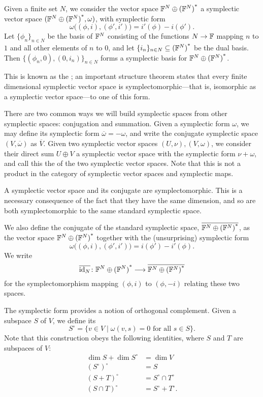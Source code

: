 \begin{example}
  \label{ex:symplectic_space_generated_by_set}
  Given a finite set $N$, we consider the vector space ${{\mathbb F}^{N} \oplus {({\mathbb F}^{N})}^\ast}$ a symplectic
  vector space $({{\mathbb F}^{N} \oplus {({\mathbb F}^{N})}^\ast},\omega)$, with symplectic form 
  \[
    \omega\big((\phi,i),(\phi',i')\big) = i'(\phi)-i(\phi').  
  \] 
  Let $\{\phi_n\}_{n \in N}$ be the basis of ${\mathbb F}^N$ consisting of the functions
  $N \to {\mathbb F}$ mapping $n$ to $1$ and all other elements of $n$ to $0$, and let
  $\{i_n\}_{n \in N} \subseteq {({\mathbb F}^N)}^\ast$ be the dual basis. Then
  $\{(\phi_n,0),(0,i_n)\}_{n\in N}$ forms a symplectic basis for ${{\mathbb F}^{N} \oplus {({\mathbb F}^{N})}^\ast}$.  

  This is known as the ; an important
  structure theorem states that every finite dimensional symplectic vector space
  is symplectomorphic---that is, isomorphic as a symplectic vector space---to
  one of this form. 
\end{example}

There are two common ways we will build symplectic spaces from other
symplectic spaces: conjugation and summation. Given a symplectic form $\omega$,
we may define its  symplectic form $\overline\omega = -
\omega$, and write the conjugate symplectic space $(V,\overline\omega)$ as
$\overline V$. Given two symplectic vector spaces $(U, \nu),(V,\omega)$, we
consider their direct sum $U \oplus V$ a symplectic vector space with the
symplectic form $\nu+\omega$, and call this the  of the two
symplectic vector spaces. Note that this is not a product in the category of
symplectic vector spaces and symplectic maps.

\begin{example}
  \label{ex:symplectomorphisms}
  A symplectic vector space and its conjugate are symplectomorphic. This is a
  necessary consequence of the fact that they have the same dimension, and so
  are both symplectomorphic to the same standard symplectic space. 
  
  We also define the conjugate of the standard symplectic space,
  $\overline{{{\mathbb F}^{N} \oplus {({\mathbb F}^{N})}^\ast}}$, as the vector space ${{\mathbb F}^{N} \oplus {({\mathbb F}^{N})}^\ast}$ together with the
  (unsurprising) symplectic form
  \[
    \omega\big((\phi,i),(\phi',i')\big) = i(\phi')-i'(\phi).  
  \] 
  We write 
  \[
    \overline{\mathrm{id}_N}{\colon} {{\mathbb F}^{N} \oplus {({\mathbb F}^{N})}^\ast} \longrightarrow \overline{{{\mathbb F}^{N} \oplus {({\mathbb F}^{N})}^\ast}}
  \]
  for the symplectomorphism mapping $(\phi,i)$ to $(\phi,-i)$ relating these two
  spaces.
\end{example}

The symplectic form provides a notion of orthogonal complement.  Given a subspace $S$ of $V$, we define its 
\[
  S^\circ = \{v \in V \mid \omega(v,s) = 0 \textrm{ for all } s \in S\}.
\]
Note that this construction obeys the following identities, where $S$ and $T$
are subspaces of $V$:
\begin{align*}
  \dim S+ \dim S^\circ &= \dim V \\
  (S^\circ)^\circ &= S \\
  (S + T)^\circ &= S^\circ \cap T^\circ \\
  (S \cap T)^\circ &= S^\circ + T^\circ.
\end{align*}

